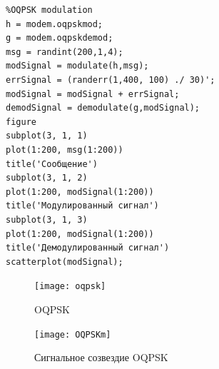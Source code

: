 \documentclass[10pt,a4paper]{article}
\begin{document}
\FloatBarrier
\begin{verbatim}
%OQPSK modulation
h = modem.oqpskmod;
g = modem.oqpskdemod;
msg = randint(200,1,4);
modSignal = modulate(h,msg);
errSignal = (randerr(1,400, 100) ./ 30)';
modSignal = modSignal + errSignal;
demodSignal = demodulate(g,modSignal);
figure
subplot(3, 1, 1)
plot(1:200, msg(1:200))
title('Сообщение')
subplot(3, 1, 2)
plot(1:200, modSignal(1:200))
title('Модулированный сигнал')
subplot(3, 1, 3)
plot(1:200, modSignal(1:200))
title('Демодулированный сигнал')
scatterplot(modSignal);
\end{verbatim}
\begin{figure}[h]\centering
	\texttt{[image: oqpsk]}
	\caption{OQPSK}\label{fig.oqpsk}
\end{figure}
\begin{figure}[h]\centering
	\texttt{[image: OQPSKm]}
	\caption{Сигнальное созвездие OQPSK}\label{fig.OQPSKm}
\end{figure}                                                                                                                                                                                                                                                                                                                                                                                                                                                                                                                                                                                                                                                                                                                                                                                                                                                                                                                                                                                                                                                                                                                                                                                                                                                                                                                                                                                                                                                                        
\end{document}
